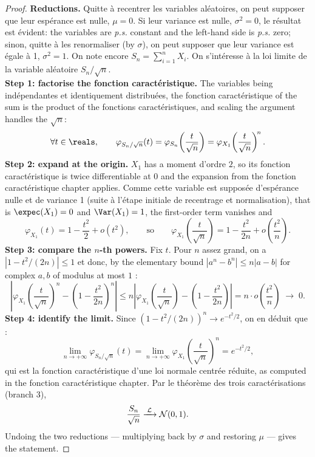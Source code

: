 \begin{proof}
  \textbf{Reductions.} Quitte à recentrer les variables aléatoires, on peut
  supposer que leur espérance est nulle, $\mu = 0$. Si leur variance est nulle,
  $\sigma^{2} = 0$, le résultat est évident: the variables are \textit{p.s.}
  constant and the left-hand side is \textit{p.s.} zero; sinon, quitte à les
  renormaliser (by $\sigma$), on peut supposer que leur variance est égale à 1,
  $\sigma^{2} = 1$. On note encore
  $S_{n} = \sum_{i=1}^{n} X_{i}$. On s'intéresse à la loi limite de la variable
  aléatoire $S_{n}/\sqrt{n}$.\\
  \textbf{Step 1: factorise the fonction caractéristique.} The variables being
  indépendantes et identiquement distribuées, the fonction caractéristique of
  the sum is the product of the fonctions caractéristiques, and scaling the
  argument handles the $\sqrt{n}$:
  \[
    \forall t \in \reals, \qquad
    \varphi_{S_{n}/\sqrt{n}}(t) = \varphi_{S_{n}}\!\left(\frac{t}{\sqrt{n}}\right)
      = \varphi_{X_{1}}\!\left(\frac{t}{\sqrt{n}}\right)^{\! n} .
  \]
  \textbf{Step 2: expand at the origin.} $X_{1}$ has a moment d'ordre $2$, so
  its fonction caractéristique is twice differentiable at $0$ and the expansion
  from the fonction caractéristique chapter applies. Comme cette variable est supposée
  d'espérance nulle et de variance 1 (suite à l'étape initiale de recentrage et
  normalisation), that is $\expec(X_{1}) = 0$ and
  $\Var(X_{1}) = 1$, the first-order term vanishes and
  \[
    \varphi_{X_{1}}(t) = 1 - \frac{t^{2}}{2} + o(t^{2}) ,
    \qquad \text{so} \qquad
    \varphi_{X_{1}}\!\left(\frac{t}{\sqrt{n}}\right)
      = 1 - \frac{t^{2}}{2n} + o\!\left(\frac{t^{2}}{n}\right) .
  \]
  \textbf{Step 3: compare the $n$-th powers.} Fix $t$. Pour $n$ assez grand, on
  a $|1 - t^{2}/(2n)| \leq 1$ et donc, by the elementary bound
  $|a^{n} - b^{n}| \leq n|a-b|$ for complex $a, b$ of modulus at most $1$ :
  \[
    \left| \varphi_{X_{1}}\!\left(\frac{t}{\sqrt{n}}\right)^{\! n}
      - \left(1 - \frac{t^{2}}{2n}\right)^{\! n} \right|
    \leq n \left| \varphi_{X_{1}}\!\left(\frac{t}{\sqrt{n}}\right)
      - \left(1 - \frac{t^{2}}{2n}\right) \right|
    = n \cdot o\!\left(\frac{t^{2}}{n}\right)
    \; \longrightarrow \; 0 .
  \]
  \textbf{Step 4: identify the limit.} Since
  $(1 - t^{2}/(2n))^{n} \to e^{-t^{2}/2}$, on en déduit que :
  \[
    \lim_{n \to +\infty} \varphi_{S_{n}/\sqrt{n}}(t)
      = \lim_{n \to +\infty}
        \varphi_{X_{1}}\!\left(\frac{t}{\sqrt{n}}\right)^{\! n}
      = e^{-t^{2}/2} ,
  \]
  qui est la fonction caractéristique d'une loi normale centrée réduite, as
  computed in the fonction caractéristique chapter. Par le théorème des trois
  caractérisations (branch 3),
  \[
    \frac{S_{n}}{\sqrt{n}} \xrightarrow{\;\mathcal{L}\;} \mathcal{N}(0,1) .
  \]
  Undoing the two reductions --- multiplying back by $\sigma$ and restoring
  $\mu$ --- gives the statement.
\end{proof}

